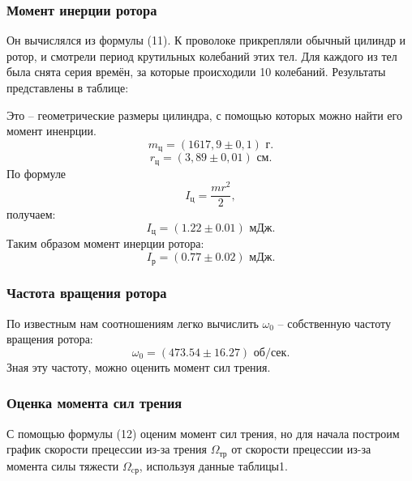 \documentclass[a4paper, 12pt]{article}%
\begin{document}
\subsubsection{Момент инерции ротора}
Он вычислялся из формулы (11). К проволоке прикрепляли обычный цилиндр и ротор, и смотрели период крутильных колебаний этих тел. Для каждого из тел была снята серия времён, за которые происходили 10 колебаний. Результаты представлены в таблице:
\begin{table}[h]
\end{table}
Это -- геометрические размеры цилиндра, с помощью которых можно найти  его момент иненрции.
\[m_{\text{ц}}=(1617,9\pm0,1) \text{ г}.\]
\[r_{\text{ц}}=(3,89\pm0,01) \text{ см}.\]
По формуле
\[I_{\text{ц}}=\frac{mr^2}{2},\]
получаем:
\[I_{\text{ц}}=(1.22\pm0.01) \text{ мДж}.\]
Таким образом момент инерции ротора:
\[I_{\text{р}}=(0.77\pm0.02) \text{ мДж}.\]
\subsubsection{Частота вращения ротора}
По известным нам соотношениям легко вычислить $\omega_0$ -- собственную частоту вращения ротора:
\[\omega_0=(473.54\pm16.27) \text{ об/сек}.\]
Зная эту частоту, можно оценить момент сил трения.
\subsubsection{Оценка момента сил трения} 
С помощью формулы (12) оценим момент сил трения, но для начала построим график скорости прецессии из-за трения $\Omega_{\text{тр}}$
от скорости прецессии из-за момента силы тяжести $\Omega_{\text{cр}}$, используя данные таблицы1.
\end{document}
